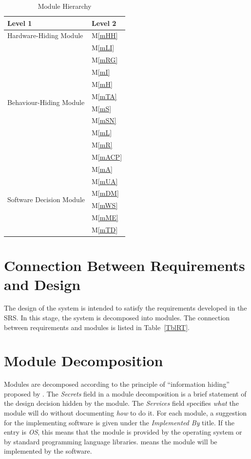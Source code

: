 \documentclass[12pt, titlepage]{article}
\newcommand{\mref}[1]{M\ref{#1}}
\begin{document}
\begin{table}[H]
\centering
\begin{tabular}{p{} p{}}
\toprule
\textbf{Level 1} & \textbf{Level 2}\\
\midrule

{Hardware-Hiding Module}
& \mref{mHH}\\
\midrule

\multirow{10}{0.3\textwidth}{Behaviour-Hiding Module} 
& \mref{mLI}\\
& \mref{mRG}\\
& \mref{mI}\\
& \mref{mH}\\
& \mref{mTA}\\
& \mref{mS}\\
& \mref{mSN}\\
& \mref{mL}\\
& \mref{mR}\\
& \mref{mACP}\\
\midrule

\multirow{6}{0.3\textwidth}{Software Decision Module} 
& \mref{mA}\\
& \mref{mUA}\\
& \mref{mDM}\\
& \mref{mWS}\\
& \mref{mME}\\
& \mref{mTD}\\
\bottomrule

\end{tabular}
\caption{Module Hierarchy}
\label{TblMH}
\end{table}

\section{Connection Between Requirements and Design} \label{SecConnection}

The design of the system is intended to satisfy the requirements developed in
the SRS. In this stage, the system is decomposed into modules. The connection
between requirements and modules is listed in Table~\ref{TblRT}.

\section{Module Decomposition} \label{SecMD}

Modules are decomposed according to the principle of ``information hiding''
proposed by \citet{ParnasEtAl1984}. The \emph{Secrets} field in a module
decomposition is a brief statement of the design decision hidden by the
module. The \emph{Services} field specifies \emph{what} the module will do
without documenting \emph{how} to do it. For each module, a suggestion for the
implementing software is given under the \emph{Implemented By} title. If the
entry is \emph{OS}, this means that the module is provided by the operating
system or by standard programming language libraries.  \emph{\progname{}} means the
module will be implemented by the \progname{} software.
\end{document}
